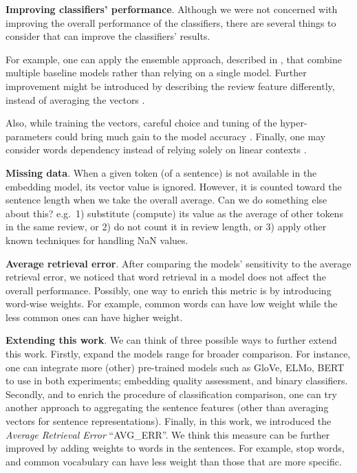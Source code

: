 \documentclass[11pt,letterpaper]{article}
\begin{document}
\textbf{Improving classifiers' performance}. Although we were not
concerned with improving the overall performance of the classifiers,
there are several things to consider that can improve the classifiers'
results.

For example, one can apply the ensemble approach, described in
\citep{Mesnil:2014ti}, that combine multiple baseline models rather than
relying on a single model. Further improvement might be introduced by
describing the review feature differently, instead of averaging the
vectors \citep{lebret2015sum}.

Also, while training the vectors, careful choice and tuning of the
hyper-parameters could bring much gain to the model accuracy
\citep{Levy:2015us}. Finally, one may consider words dependency instead
of relying solely on linear contexts \citep{grefenstette2014deep}.

\textbf{Missing data}. When a given token (of a sentence) is not
available in the embedding model, its vector value is ignored. However,
it is counted toward the sentence length when we take the overall
average. Can we do something else about this? e.g.~1) substitute
(compute) its value as the average of other tokens in the same review,
or 2) do not count it in review length, or 3) apply other known
techniques for handling NaN values.

\textbf{Average retrieval error}. After comparing the models'
sensitivity to the average retrieval error, we noticed that word
retrieval in a model does not affect the overall performance. Possibly,
one way to enrich this metric is by introducing word-wise weights. For
example, common words can have low weight while the less common ones can
have higher weight.

\textbf{Extending this work}. We can think of three possible ways to
further extend this work. Firstly, expand the models range for broader
comparison. For instance, one can integrate more (other) pre-trained
models such as GloVe, ELMo, BERT to use in both experiments; embedding
quality assessment, and binary classifiers. Secondly, and to enrich the
procedure of classification comparison, one can try another approach to
aggregating the sentence features (other than averaging vectors for
sentence representations). Finally, in this work, we introduced the
\emph{Average Retrieval Error} ``AVG\_ERR''. We think this measure can
be further improved by adding weights to words in the sentences. For
example, stop words, and common vocabulary can have less weight than
those that are more specific.
\end{document}

